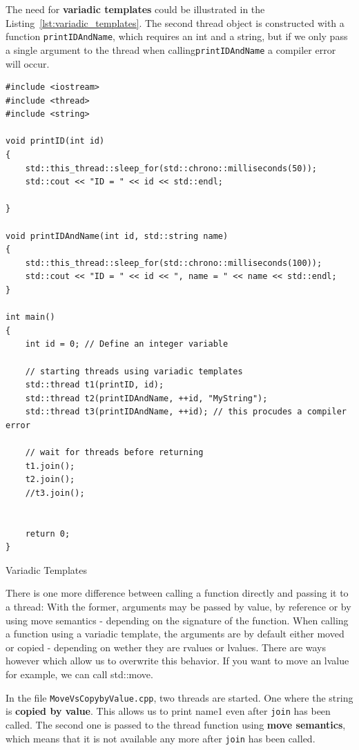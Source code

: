 \documentclass[11pt, a4paper]{article}
\begin{document}
The need for \textbf{variadic templates} could be illustrated in the Listing~\ref{lst:variadic_templates}. The second thread object is constructed with a function \texttt{printIDAndName}, which requires an int and a string, but if we only pass a single argument to the thread when calling\texttt{printIDAndName} a compiler error will occur.  



\begin{listing}
\begin{verbatim}
#include <iostream>
#include <thread>
#include <string>

void printID(int id)
{
    std::this_thread::sleep_for(std::chrono::milliseconds(50));
    std::cout << "ID = " << id << std::endl;
    
}

void printIDAndName(int id, std::string name)
{
    std::this_thread::sleep_for(std::chrono::milliseconds(100));
    std::cout << "ID = " << id << ", name = " << name << std::endl;
}

int main()
{
    int id = 0; // Define an integer variable

    // starting threads using variadic templates
    std::thread t1(printID, id);
    std::thread t2(printIDAndName, ++id, "MyString");
    std::thread t3(printIDAndName, ++id); // this procudes a compiler error

    // wait for threads before returning
    t1.join();
    t2.join();
    //t3.join();


    return 0;
}
\end{verbatim}
\caption{Variadic Templates}
\label{lst:variadic_templates}
\end{listing}




There is one more difference between calling a function directly and passing it to a thread: With the former, arguments may be passed by value, by reference or by using move semantics - depending on the signature of the function. When calling a function using a variadic template, the arguments are by default either moved or copied - depending on wether they are rvalues or lvalues. There are ways however which allow us to overwrite this behavior. If you want to move an lvalue for example, we can call std::move. 


In the file \texttt{MoveVsCopybyValue.cpp}, two threads are started. One where the string is \textbf{copied by value}. This allows us to print name1 even after \texttt{join} has been called. The second one is passed to the thread function using \textbf{move semantics}, which means that it is not available any more after \texttt{join} has been called.
\end{document}
